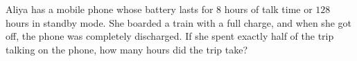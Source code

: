 Aliya has a mobile phone whose battery lasts for $8$ hours of talk time or $128$ hours in standby mode. She boarded a train with a full charge, and when she got off, the phone was completely discharged. If she spent exactly half of the trip talking on the phone, how many hours did the trip take?
